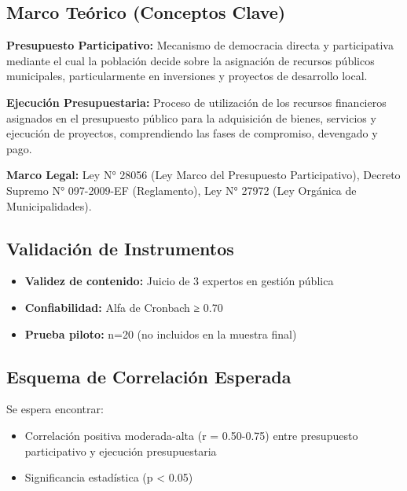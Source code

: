\documentclass[
  man,
  floatsintext,
  longtable,
  a4paper,
  nolmodern,
  notxfonts,
  notimes,
  12pt,
  colorlinks=true,linkcolor=blue,citecolor=blue,urlcolor=blue]{apa7}
\providecommand{\tightlist}{%
  \setlength{\itemsep}{0pt}\setlength{\parskip}{0pt}}
\begin{document}
\subsection{Marco Teórico (Conceptos
Clave)}\label{marco-teuxf3rico-conceptos-clave-6}

\textbf{Presupuesto Participativo:} Mecanismo de democracia directa y
participativa mediante el cual la población decide sobre la asignación
de recursos públicos municipales, particularmente en inversiones y
proyectos de desarrollo local.

\textbf{Ejecución Presupuestaria:} Proceso de utilización de los
recursos financieros asignados en el presupuesto público para la
adquisición de bienes, servicios y ejecución de proyectos, comprendiendo
las fases de compromiso, devengado y pago.

\textbf{Marco Legal:} Ley N° 28056 (Ley Marco del Presupuesto
Participativo), Decreto Supremo N° 097-2009-EF (Reglamento), Ley N°
27972 (Ley Orgánica de Municipalidades).

\subsection{Validación de
Instrumentos}\label{validaciuxf3n-de-instrumentos-1}

\begin{itemize}
\tightlist
\item
  \textbf{Validez de contenido:} Juicio de 3 expertos en gestión pública
\item
  \textbf{Confiabilidad:} Alfa de Cronbach ≥ 0.70
\item
  \textbf{Prueba piloto:} n=20 (no incluidos en la muestra final)
\end{itemize}

\subsection{Esquema de Correlación
Esperada}\label{esquema-de-correlaciuxf3n-esperada}

Se espera encontrar:

\begin{itemize}
\tightlist
\item
  Correlación positiva moderada-alta (r = 0.50-0.75) entre presupuesto
  participativo y ejecución presupuestaria
\item
  Significancia estadística (p \textless{} 0.05)
\end{itemize}
\end{document}
